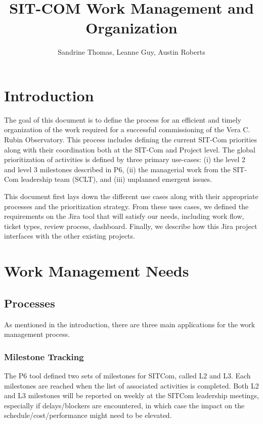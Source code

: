 \documentclass[SE,authoryear,toc]{lsstdoc}
\title{SIT-COM Work Management and Organization}
\author{%
Sandrine Thomas, Leanne Guy, Austin Roberts
}
\date{\vcsDate}
\begin{document}
\maketitle

\section{Introduction}
The goal of this document is to define the process for an efficient and timely organization of the work required for a successful commissioning of the Vera C. Rubin Observatory. 
This process includes defining the current SIT-Com priorities along with their coordination both at the SIT-Com and Project level. 
The global prioritization of activities is defined by three primary use-cases: (i) the level 2 and level 3 milestones described in P6, (ii) the managerial work from the SIT-Com leadership team (SCLT), and (iii) unplanned emergent issues.

This document first lays down the different use cases along with their appropriate processes and the prioritization strategy.
 From these uses cases, we defined the requirements on the Jira tool that will satisfy our needs, including work flow, ticket types, review process, dashboard. 
 Finally, we describe how this Jira project interfaces with the other existing projects. 

\section{Work Management Needs}
\subsection{Processes}
As mentioned in the introduction, there are three main applications for the work management process. 
\subsubsection{Milestone Tracking}
The P6 tool defined two sets of milestones for SITCom, called L2 and L3. Each milestones are reached when the list of associated activities is completed. 
Both L2 and L3 milestones will be reported on weekly at the SITCom leadership meetings, especially if delays/blockers are encountered, in which case the impact on the schedule/cost/performance might need to be elevated.
\end{document}
